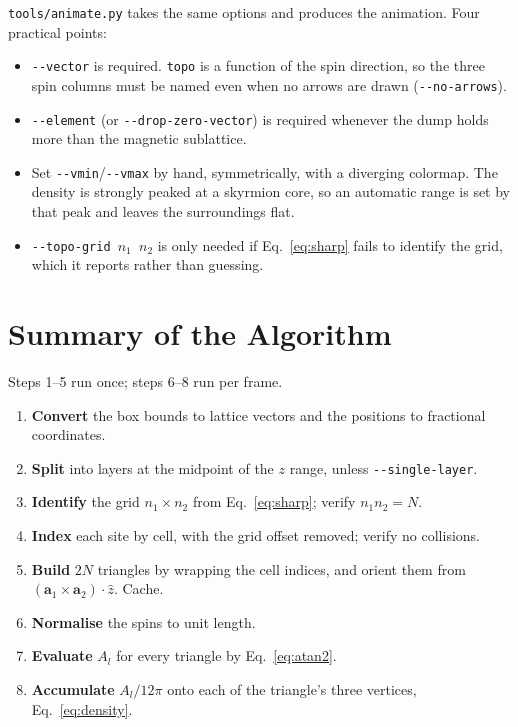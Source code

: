 \documentclass[12pt, a4paper, oneside]{article}
\newcommand{\avec}{\mathbf{a}}
\newcommand{\Na}{N}
\begin{document}
\texttt{tools/animate.py} takes the same options and produces the animation.
Four practical points:

\begin{itemize}
    \item \texttt{-\/-vector} is required. \texttt{topo} is a function of the
    spin direction, so the three spin columns must be named even when no arrows
    are drawn (\texttt{-\/-no-arrows}).
    \item \texttt{-\/-element} (or \texttt{-\/-drop-zero-vector}) is required
    whenever the dump holds more than the magnetic sublattice.
    \item Set \texttt{-\/-vmin}/\texttt{-\/-vmax} by hand, symmetrically, with a
    diverging colormap. The density is strongly peaked at a skyrmion core, so
    an automatic range is set by that peak and leaves the surroundings flat.
    \item \texttt{-\/-topo-grid $n_1$ $n_2$} is only needed if
    Eq.~\eqref{eq:sharp} fails to identify the grid, which it reports rather
    than guessing.
\end{itemize}

\section{Summary of the Algorithm}

Steps 1--5 run once; steps 6--8 run per frame.

\begin{enumerate}
    \item \textbf{Convert} the box bounds to lattice vectors and the positions
    to fractional coordinates.
    \item \textbf{Split} into layers at the midpoint of the $z$ range, unless
    \texttt{-\/-single-layer}.
    \item \textbf{Identify} the grid $n_1\times n_2$ from Eq.~\eqref{eq:sharp};
    verify $n_1n_2 = \Na$.
    \item \textbf{Index} each site by cell, with the grid offset removed;
    verify no collisions.
    \item \textbf{Build} $2\Na$ triangles by wrapping the cell indices, and
    orient them from $(\avec_1\times\avec_2)\cdot\hat z$. Cache.
    \item \textbf{Normalise} the spins to unit length.
    \item \textbf{Evaluate} $A_l$ for every triangle by Eq.~\eqref{eq:atan2}.
    \item \textbf{Accumulate} $A_l/12\pi$ onto each of the triangle's three
    vertices, Eq.~\eqref{eq:density}.
\end{enumerate}
\end{document}
